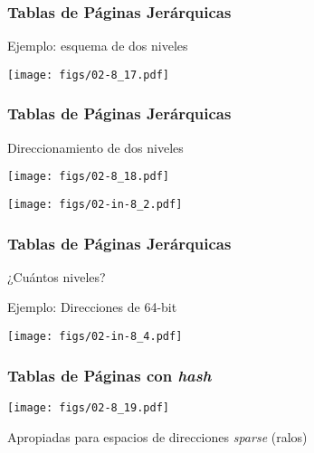 \documentclass[letter]{beamer}
\begin{document}
\begin{frame}
  \frametitle{Tablas de Páginas Jerárquicas}

  Ejemplo: esquema de dos niveles

  \begin{center}
    \texttt{[image: figs/02-8\_17.pdf]}
  \end{center}
  
  
\end{frame}
\begin{frame}
  \frametitle{Tablas de Páginas Jerárquicas}

  Direccionamiento de dos niveles

  \begin{center}
    \texttt{[image: figs/02-8\_18.pdf]}
  \end{center}
  
  \begin{center}
    \texttt{[image: figs/02-in-8\_2.pdf]}
  \end{center}
  

\end{frame}

\begin{frame}
  \frametitle{Tablas de Páginas Jerárquicas}

  ¿Cuántos niveles? 
  
  Ejemplo: Direcciones de 64-bit

  \begin{center}
    \texttt{[image: figs/02-in-8\_4.pdf]}
  \end{center}

  

  
\end{frame}

\begin{frame}
  \frametitle{Tablas de Páginas con {\em hash}}

  \begin{center}
    \texttt{[image: figs/02-8\_19.pdf]}
  \end{center}

  Apropiadas para espacios de direcciones {\em sparse} (ralos)

\end{frame}
\end{document}
